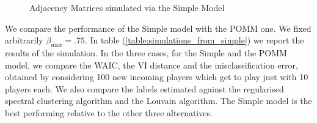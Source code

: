 \documentclass[11pt]{amsart}
\begin{document}
\begin{figure}[htbp]
    \centering
    \hfill
    \hfill
    \caption{Adjacency Matrices simulated via the Simple Model}
    \label{fig:all_images}
\end{figure}

We compare the performance of the Simple model with the POMM one. We fixed arbitrarily $\beta_{\max} = .75$.
In table (\ref{table:simulations_from_simple}) we report the results of the simulation. In the three cases, for the Simple and the POMM model, we compare the WAIC, the VI distance and the misclassification error, obtained by considering 100 new incoming players which get to play just with 10 players each. We also compare the labels estimated against the regularised spectral clustering algorithm and the Louvain algorithm. The Simple model is the best performing relative to the other three alternatives.
\end{document}

